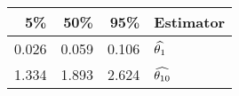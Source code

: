 \begin{table}[ht]
\centering
\begin{tabular}{rrrl}
  \hline
5\% & 50\% & 95\% & Estimator \\ 
  \hline
0.026 & 0.059 & 0.106 & $\widehat{\theta_1}$ \\ 
  1.334 & 1.893 & 2.624 & $\widehat{\theta_{10}}$ \\ 
   \hline
\end{tabular}
\end{table}
